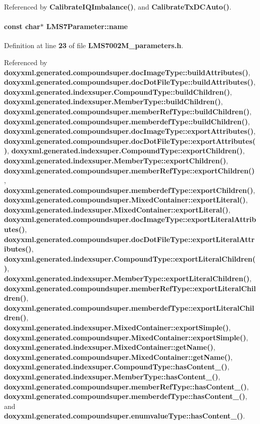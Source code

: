 Referenced by {\bf Calibrate\+I\+Q\+Imbalance()}, and {\bf Calibrate\+Tx\+D\+C\+Auto()}.

\paragraph[{name}]{\setlength{\rightskip}{0pt plus 5cm}const char$\ast$ L\+M\+S7\+Parameter\+::name}\label{structLMS7Parameter_a3364b5a52f864678818d2b38f2f93214}


Definition at line {\bf 23} of file {\bf L\+M\+S7002\+M\+\_\+parameters.\+h}.



Referenced by {\bf doxyxml.\+generated.\+compoundsuper.\+doc\+Image\+Type\+::build\+Attributes()}, {\bf doxyxml.\+generated.\+compoundsuper.\+doc\+Dot\+File\+Type\+::build\+Attributes()}, {\bf doxyxml.\+generated.\+indexsuper.\+Compound\+Type\+::build\+Children()}, {\bf doxyxml.\+generated.\+indexsuper.\+Member\+Type\+::build\+Children()}, {\bf doxyxml.\+generated.\+compoundsuper.\+member\+Ref\+Type\+::build\+Children()}, {\bf doxyxml.\+generated.\+compoundsuper.\+memberdef\+Type\+::build\+Children()}, {\bf doxyxml.\+generated.\+compoundsuper.\+doc\+Image\+Type\+::export\+Attributes()}, {\bf doxyxml.\+generated.\+compoundsuper.\+doc\+Dot\+File\+Type\+::export\+Attributes()}, {\bf doxyxml.\+generated.\+indexsuper.\+Compound\+Type\+::export\+Children()}, {\bf doxyxml.\+generated.\+indexsuper.\+Member\+Type\+::export\+Children()}, {\bf doxyxml.\+generated.\+compoundsuper.\+member\+Ref\+Type\+::export\+Children()}, {\bf doxyxml.\+generated.\+compoundsuper.\+memberdef\+Type\+::export\+Children()}, {\bf doxyxml.\+generated.\+compoundsuper.\+Mixed\+Container\+::export\+Literal()}, {\bf doxyxml.\+generated.\+indexsuper.\+Mixed\+Container\+::export\+Literal()}, {\bf doxyxml.\+generated.\+compoundsuper.\+doc\+Image\+Type\+::export\+Literal\+Attributes()}, {\bf doxyxml.\+generated.\+compoundsuper.\+doc\+Dot\+File\+Type\+::export\+Literal\+Attributes()}, {\bf doxyxml.\+generated.\+indexsuper.\+Compound\+Type\+::export\+Literal\+Children()}, {\bf doxyxml.\+generated.\+indexsuper.\+Member\+Type\+::export\+Literal\+Children()}, {\bf doxyxml.\+generated.\+compoundsuper.\+member\+Ref\+Type\+::export\+Literal\+Children()}, {\bf doxyxml.\+generated.\+compoundsuper.\+memberdef\+Type\+::export\+Literal\+Children()}, {\bf doxyxml.\+generated.\+indexsuper.\+Mixed\+Container\+::export\+Simple()}, {\bf doxyxml.\+generated.\+compoundsuper.\+Mixed\+Container\+::export\+Simple()}, {\bf doxyxml.\+generated.\+indexsuper.\+Mixed\+Container\+::get\+Name()}, {\bf doxyxml.\+generated.\+compoundsuper.\+Mixed\+Container\+::get\+Name()}, {\bf doxyxml.\+generated.\+indexsuper.\+Compound\+Type\+::has\+Content\+\_\+()}, {\bf doxyxml.\+generated.\+indexsuper.\+Member\+Type\+::has\+Content\+\_\+()}, {\bf doxyxml.\+generated.\+compoundsuper.\+member\+Ref\+Type\+::has\+Content\+\_\+()}, {\bf doxyxml.\+generated.\+compoundsuper.\+memberdef\+Type\+::has\+Content\+\_\+()}, and {\bf doxyxml.\+generated.\+compoundsuper.\+enumvalue\+Type\+::has\+Content\+\_\+()}.


